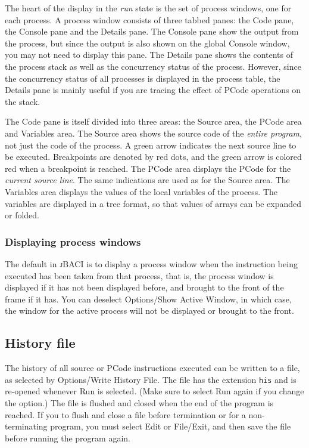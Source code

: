\documentclass[11pt]{article}
\newcommand{\jb}{\textsc{\sffamily jBACI}}
\newcommand{\p}[1]{\texttt{#1}}
\newcommand{\bu}[1]{\textsf{#1}}
\begin{document}
The heart of the display in the \emph{run} state
is the set of process windows, one for each process.
A process window consists of three tabbed panes:
the \bu{Code} pane, the \bu{Console} pane and the \bu{Details} pane.
The \bu{Console} pane show the output from the process,
but since the output is also shown on the global \bu{Console} window,
you may not need to display this pane.
The \bu{Details} pane shows the contents of the process stack
as well as the concurrency status of the process.
However, since the concurrency status of all processes
is displayed in the process table, the \bu{Details} pane
is mainly useful if you are tracing the effect of PCode
operations on the stack.

The \bu{Code} pane is itself divided into three areas:
the \bu{Source} area, the \bu{PCode} area and \bu{Variables} area.
The \bu{Source} area shows the source code of the \emph{entire program},
not just the code of the process.
A green arrow indicates the next source line to be executed.
Breakpoints are denoted by red dots,
and the green arrow is colored red when a breakpoint is reached.
The \bu{PCode} area displays the PCode for the \emph{current source line}.
The same indications are used as for the \bu{Source} area.
The \bu{Variables} area displays the values of the local variables
of the process.
The variables are displayed in a tree format,
so that values of arrays can be expanded or folded.

\subsubsection{Displaying process windows}

The default in \jb{} is to display a process window when
the instruction being executed has been taken from that process,
that is, the process window is displayed if it has not been displayed
before, and brought to the front of the frame if it has.
You can deselect \bu{Options/Show Active Window},
in which case, the window for the active process will not be displayed
or brought to the front.

\subsection{History file}

The history of all source or PCode instructions executed can be written to a file,
as selected by \bu{Options/Write History File}.
The file has the extension \p{his} and is re-opened whenever \bu{Run} is selected.
(Make sure to select \bu{Run} again if you change the option.)
The file is flushed and closed when the end of the program is reached.
If you to flush and close a file before termination or for a non-terminating program,
you must select \bu{Edit} or \bu{File/Exit}, and then save the file before
running the program again.
\end{document}
